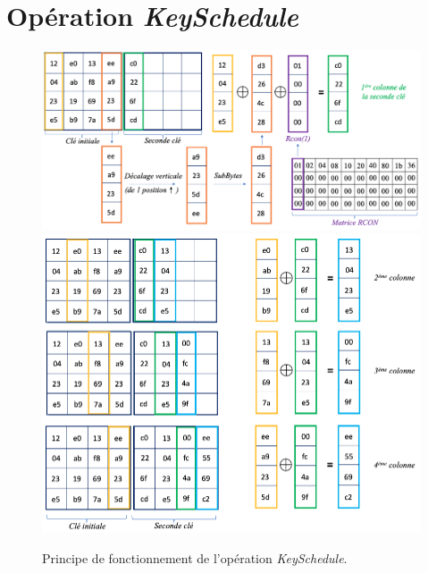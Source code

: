 \documentclass[oneside]{book}
\begin{document}
\section{Opération \textit{KeySchedule}}
\label{ann:KeySchedule}
\begin{figure}[htbp]
    \centering
    \includegraphics[scale=0.35]{image/KeySchedule1}
    \includegraphics[scale=0.48]{image/KeySchedule2}
    \caption{Principe de fonctionnement de l'opération \textit{KeySchedule}.}
    \label{fig:KeySchedule1}
\end{figure}

\newpage

\end{document}
